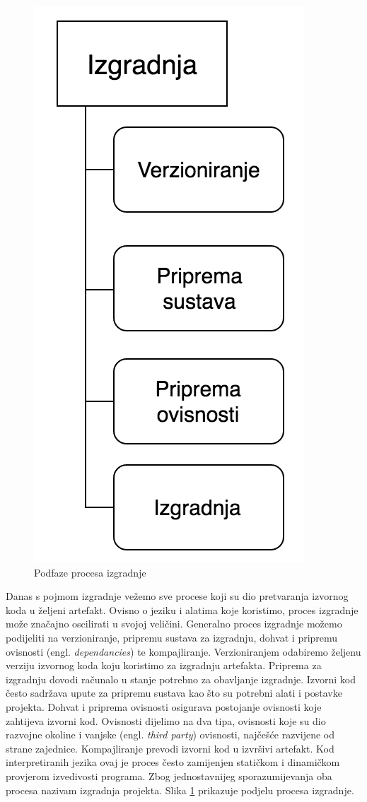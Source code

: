 \documentclass[times, utf8, diplomski, numeric]{fer}
\newcommand{\eng}[1]{(engl. \textit{#1})}
\begin{document}
\begin{figure}[b!]
\centering
\includegraphics[scale=0.5]{BuildProcess}
\caption{Podfaze procesa izgradnje}
\label{fig:BuildProcess}
\end{figure}

Danas s pojmom izgradnje vežemo sve procese koji su dio pretvaranja izvornog koda u željeni artefakt. Ovisno o jeziku i alatima koje koristimo, proces izgradnje može značajno oscilirati u svojoj veličini. Generalno proces izgradnje možemo podijeliti na verzioniranje, pripremu sustava za izgradnju, dohvat i pripremu ovisnosti \eng{dependancies} te kompajliranje. Verzioniranjem odabiremo željenu verziju izvornog koda koju koristimo za izgradnju artefakta. Priprema za izgradnju dovodi računalo u stanje potrebno za obavljanje izgradnje. Izvorni kod često sadržava upute za pripremu sustava kao što su potrebni alati i postavke projekta. Dohvat i priprema ovisnosti osigurava postojanje ovisnosti koje zahtijeva izvorni kod. Ovisnosti dijelimo na dva tipa, ovisnosti koje su dio razvojne okoline i vanjske \eng{third party} ovisnosti, najčešće razvijene od strane zajednice. Kompajliranje prevodi izvorni kod u izvršivi artefakt. Kod interpretiranih jezika ovaj je proces često zamijenjen statičkom i dinamičkom provjerom izvedivosti programa. Zbog jednostavnijeg sporazumijevanja oba procesa nazivam izgradnja projekta. Slika \ref{fig:BuildProcess} prikazuje podjelu procesa izgradnje.
\end{document}
